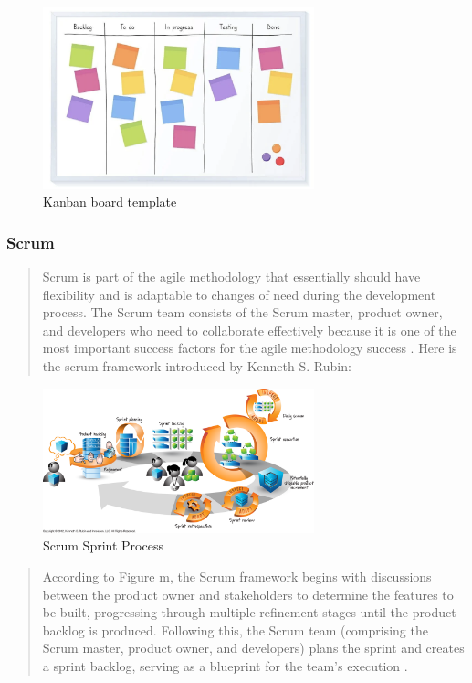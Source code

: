 \documentclass[12pt,a4paper]{article}
\begin{document}
\begin{figure}[htbp]
    \centering
    \includegraphics[width=0.7\textwidth]{images/kanban board.png}
    \caption{Kanban board template \citep{question_4.2}}
    \label{fig:example}
\end{figure}

\newpage
\subsubsection{Scrum}

\begin{quote}
Scrum is part of the agile methodology that essentially should have flexibility and is adaptable to changes of need during the development process. The Scrum team consists of the Scrum master, product owner, and developers who need to collaborate effectively because it is one of the most important success factors for the agile methodology success \citep{question_4.3}. Here is the scrum framework introduced by Kenneth S. Rubin:
\end{quote}

\begin{figure}[htbp]
    \centering
    \includegraphics[width=0.7\textwidth]{images/sprint cycle.png}
    \caption{Scrum Sprint Process \citep{question_4.4}}
    \label{fig:example}
\end{figure}

\begin{quote}
According to Figure m, the Scrum framework begins with discussions between the product owner and stakeholders to determine the features to be built, progressing through multiple refinement stages until the product backlog is produced. Following this, the Scrum team (comprising the Scrum master, product owner, and developers) plans the sprint and creates a sprint backlog, serving as a blueprint for the team's execution \citep{question_4.3}. 
\end{quote}
\end{document}
